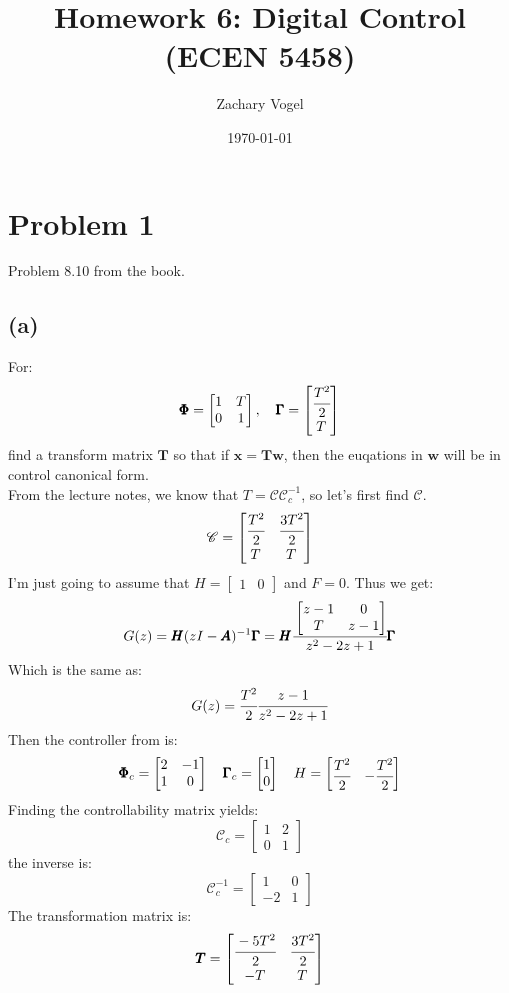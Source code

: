 \documentclass{article}
\title{Homework 6: Digital Control (ECEN 5458)}
\author{Zachary Vogel}
\date{\today}
\begin{document}
\maketitle

\section*{Problem 1}
Problem 8.10 from the book.
\subsection*{(a)}
For:
\[\pmb{\Phi}=\begin{bmatrix}1&T\\0&1\end{bmatrix},\quad \pmb{\Gamma}=\begin{bmatrix}\cfrac{T^2}{2}\\[0.5em]T\end{bmatrix}\]
find a transform matrix $\pmb{T}$ so that if $\pmb{x}=\pmb{T}\pmb{w}$, then the euqations in $\pmb{w}$ will be in control canonical form.\\
From the lecture notes, we know that $T=\mathscr{C}\mathscr{C}^{-1}_{c}$, so let's first find $\mathscr{C}$.
\[\mathscr{C}=\begin{bmatrix}\cfrac{T^2}{2}&\cfrac{3T^2}{2}\\[0.5em]T&T\end{bmatrix}\]
I'm just going to assume that $H=\begin{bmatrix}1&0\end{bmatrix}$ and $F=0$. Thus we get:
\[G(z)=\pmb{H}(zI-\pmb{A})^{-1}\pmb{\Gamma}=\pmb{H}\cfrac{\begin{bmatrix}z-1&0\\T&z-1\end{bmatrix}}{z^2-2z+1}\pmb{\Gamma}\]
Which is the same as:
\[G(z)=\cfrac{T^2}{2}\cfrac{z-1}{z^2-2z+1}\]
Then the controller from is:
\[\pmb{\Phi}_c=\begin{bmatrix}2&-1\\1&0\end{bmatrix}\quad \pmb{\Gamma}_c=\begin{bmatrix}1\\0\end{bmatrix}\quad H=\begin{bmatrix}\cfrac{T^2}{2}&-\cfrac{T^2}{2}\end{bmatrix}\]
Finding the controllability matrix yields:
\[\mathscr{C}_c=\begin{bmatrix}1&2\\0&1\end{bmatrix}\]
the inverse is:
\[\mathscr{C}^{-1}_c=\begin{bmatrix}1&0\\-2&1\end{bmatrix}\]
The transformation matrix is:
\[\pmb{T}=\begin{bmatrix}\cfrac{-5T^2}{2}&\cfrac{3T^2}{2}\\[0.5em]-T&T\end{bmatrix}\]
\end{document}
